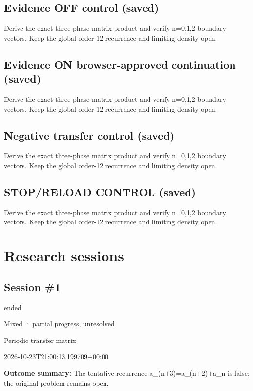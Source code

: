 \documentclass[11pt]{article}
\begin{document}
\subsection{Evidence OFF control (saved)}
Derive the exact three-phase matrix product and verify n=0,1,2 boundary vectors. Keep the global order-12 recurrence and limiting density open.\par
\subsection{Evidence ON browser-approved continuation (saved)}
Derive the exact three-phase matrix product and verify n=0,1,2 boundary vectors. Keep the global order-12 recurrence and limiting density open.\par
\subsection{Negative transfer control (saved)}
Derive the exact three-phase matrix product and verify n=0,1,2 boundary vectors. Keep the global order-12 recurrence and limiting density open.\par
\subsection{STOP/RELOAD CONTROL (saved)}
Derive the exact three-phase matrix product and verify n=0,1,2 boundary vectors. Keep the global order-12 recurrence and limiting density open.\par
\section{Research sessions}
\subsection{Session \#1}
\begin{description}[style=nextline,font=\normalfont\bfseries,leftmargin=0pt,labelsep=0pt]
\item[Execution status] ended
\item[Outcome] Mixed · partial progress, unresolved
\item[Strategy] Periodic transfer matrix
\item[Started] 2026-10-23T21:00:13.199709+00:00
\end{description}
\textbf{Outcome summary:} The tentative recurrence a\_(n+3)=a\_(n+2)+a\_n is false; the original problem remains open.\par
\end{document}

